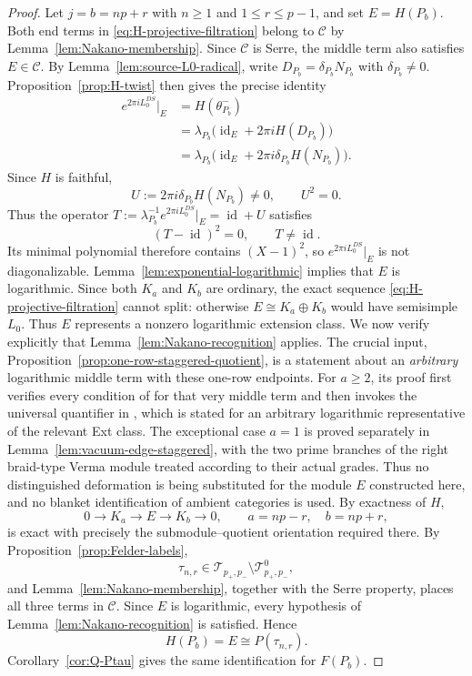 \documentclass[12pt,leqno]{amsart}
\numberwithin{equation}{section}
\newcommand{\id}{\operatorname{id}}
\begin{document}
\begin{proof}
Let $j=b=np+r$ with $n\ge1$ and $1\le r\le p-1$, and set
$E=H(P_b)$.  Both end terms in \eqref{eq:H-projective-filtration} belong to
$\mathscr C$ by Lemma~\ref{lem:Nakano-membership}.  Since $\mathscr C$
is Serre, the middle term also satisfies $E\in\mathscr C$.  By Lemma~\ref{lem:source-L0-radical}, write
$D_{P_b}=\delta_{P_b}N_{P_b}$ with $\delta_{P_b}\ne0$.  Proposition~\ref{prop:H-twist}
then gives the precise identity
\begin{equation}\label{eq:H-projective-exponential}
\begin{aligned}
 e^{2\pi iL^{DS}_0}\big|_E
 &=H(\theta^-_{P_b})\\
 &=\lambda_{P_b}\bigl(\id_E+2\pi iH(D_{P_b})\bigr)\\
 &=\lambda_{P_b}\bigl(
    \id_E+2\pi i\delta_{P_b}H(N_{P_b})
   \bigr).
\end{aligned}
\end{equation}
Since $H$ is faithful,
\[
 U:=2\pi i\delta_{P_b}H(N_{P_b})\ne0,\qquad U^2=0.
\]
Thus the operator $T:=\lambda_{P_b}^{-1}e^{2\pi iL^{DS}_0}|_E=
\id+U$ satisfies
\[
 (T-\id)^2=0,\qquad T\ne\id.
\]
Its minimal polynomial therefore contains $(X-1)^2$, so
$e^{2\pi iL^{DS}_0}|_E$ is not diagonalizable.
Lemma~\ref{lem:exponential-logarithmic} implies that $E$ is logarithmic.
Since both $K_a$ and $K_b$ are ordinary, the exact sequence
\eqref{eq:H-projective-filtration} cannot split: otherwise
$E\cong K_a\oplus K_b$ would have semisimple $L_0$.  Thus $E$
represents a nonzero logarithmic extension class.  We now verify
explicitly that Lemma~\ref{lem:Nakano-recognition} applies.  The crucial input, Proposition~\ref{prop:one-row-staggered-quotient},
is a statement about an \emph{arbitrary} logarithmic middle term with these
one-row endpoints.  For $a\ge2$, its proof first verifies every condition
of \cite[Definitions~3.14 and~5.1]{Nakano} for that very middle term and
then invokes the universal quantifier in \cite[Theorem~5.11]{Nakano},
which is stated for an arbitrary logarithmic representative of the
relevant Ext class.  The exceptional case $a=1$ is proved separately in
Lemma~\ref{lem:vacuum-edge-staggered}, with the two prime branches of the
right braid-type Verma module treated according to their actual grades.
Thus no distinguished deformation is being substituted for the module
$E$ constructed here, and no blanket identification of ambient categories
is used.  By exactness of $H$,
\[
 0\longrightarrow K_a\longrightarrow E\longrightarrow K_b
 \longrightarrow0,
 \qquad a=np-r,\quad b=np+r,
\]
is exact with precisely the submodule--quotient orientation required
there.  By Proposition~\ref{prop:Felder-labels},
\[
 \tau_{n,r}\in
 \mathcal T_{p_+,p_-}\setminus\mathcal T^0_{p_+,p_-},
\]
and Lemma~\ref{lem:Nakano-membership}, together with the Serre property,
places all three terms in $\mathscr C$.  Since $E$ is logarithmic, every
hypothesis of Lemma~\ref{lem:Nakano-recognition} is satisfied.  Hence
\[
 H(P_b)=E\cong P(\tau_{n,r}).
\]
Corollary~\ref{cor:Q-Ptau} gives the same identification for $F(P_b)$.
\end{proof}
\end{document}
